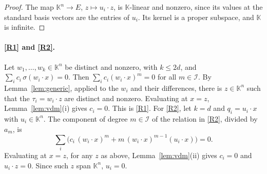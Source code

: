 \documentclass[11pt]{article}
\theoremstyle{definition}
\theoremstyle{remark}
\newcommand{\K}{\mathbb{K}}
\begin{document}
\begin{proof}
The map $\K^n\to E$, $z\mapsto u_i\cdot z$, is $\K$-linear and nonzero, since its values at the standard basis vectors are the entries of $u_i$. Its kernel is a proper subspace, and $\K$ is infinite.
\end{proof}

\paragraph{\ref{R1} and \ref{R2}.} Let $w_1,\dots,w_k\in\K^n$ be distinct and nonzero, with $k\le2d$, and $\sum_ic_i\,\sigma(w_i\cdot x)=0$. Then $\sum_ic_i(w_i\cdot x)^m=0$ for all $m\in\mathcal I$. By Lemma~\ref{lem:generic}, applied to the $w_i$ and their differences, there is $z\in\K^n$ such that the $\tau_i=w_i\cdot z$ are distinct and nonzero. Evaluating at $x=z$, Lemma~\ref{lem:vdm}(i) gives $c_i=0$. This is \ref{R1}. For \ref{R2}, let $k=d$ and $q_i=u_i\cdot x$ with $u_i\in\K^n$. The component of degree $m\in\mathcal I$ of the relation in \ref{R2}, divided by $a_m$, is
\[
\textstyle\sum_i\big(c_i\,(w_i\cdot x)^m+m\,(w_i\cdot x)^{m-1}(u_i\cdot x)\big)=0.
\]
Evaluating at $x=z$, for any $z$ as above, Lemma~\ref{lem:vdm}(ii) gives $c_i=0$ and $u_i\cdot z=0$. Since such $z$ span $\K^n$, $u_i=0$.
\end{document}
